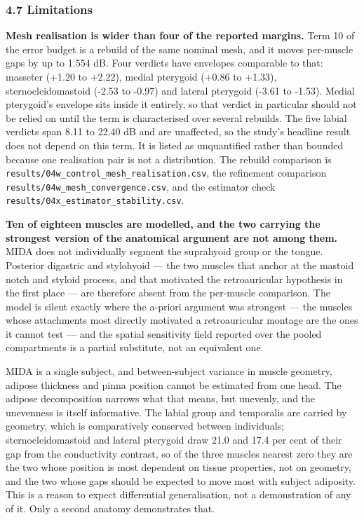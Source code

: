 \documentclass[
  11pt,
  letterpaper,
]{article}
\begin{document}
\subsubsection{4.7 Limitations}\label{limitations}

\textbf{Mesh realisation is wider than four of the reported margins.} Term 10 of the
error budget is a rebuild of the same nominal mesh, and it moves per-muscle gaps
by up to 1.554 dB. Four verdicts have envelopes comparable to that: masseter
(+1.20 to +2.22), medial pterygoid (+0.86 to +1.33), sternocleidomastoid (-2.53
to -0.97) and lateral pterygoid (-3.61 to -1.53). Medial pterygoid's envelope
sits inside it entirely, so that verdict in particular should not be relied on
until the term is characterised over several rebuilds. The five labial verdicts
span 8.11 to 22.40 dB and are unaffected, so the study's headline result does
not depend on this term. It is listed as unquantified rather than bounded
because one realisation pair is not a distribution. The rebuild comparison is
\texttt{results/04w\_control\_mesh\_realisation.csv}, the refinement comparison
\texttt{results/04w\_mesh\_convergence.csv}, and the estimator check
\texttt{results/04x\_estimator\_stability.csv}.

\textbf{Ten of eighteen muscles are modelled, and the two carrying the strongest
version of the anatomical argument are not among them.} MIDA does not
individually segment the suprahyoid group or the tongue. Posterior digastric and
stylohyoid --- the two muscles that anchor at the mastoid notch and styloid
process, and that motivated the retroauricular hypothesis in the first place ---
are therefore absent from the per-muscle comparison. The model is silent exactly
where the a-priori argument was strongest --- the muscles whose attachments most
directly motivated a retroauricular montage are the ones it cannot test --- and
the spatial sensitivity field reported over the pooled compartments is a partial
substitute, not an equivalent one.

MIDA is a single subject, and between-subject variance in muscle geometry,
adipose thickness and pinna position cannot be estimated from one head. The
adipose decomposition narrows what that means, but unevenly, and the unevenness
is itself informative. The labial group and temporalis are carried by geometry,
which is comparatively conserved between individuals; sternocleidomastoid and
lateral pterygoid draw 21.0 and 17.4 per cent of their gap from the conductivity
contrast, so of the three muscles nearest zero they are the two whose position
is most dependent on tissue properties, not on geometry, and the two whose gaps
should be expected to move most with subject adiposity. This is a reason to
expect differential generalisation, not a demonstration of any of it. Only a
second anatomy demonstrates that.
\end{document}
